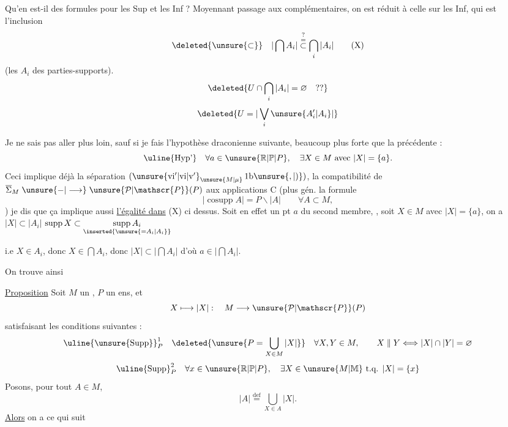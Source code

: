 
Qu'en est-il des formules pour les Sup et les Inf ? Moyennant passage aux complémentaires, on est réduit à celle sur les Inf, qui est l'inclusion
\[
\deleted{\unsure{\subset}}\quad |\bigcap A_i|\mathrel{\overset{\text{?}}{\overset{=}{\subset}}}\bigcap_i|A_i| \tag*{(X)}
\]
(les $A_i$ des parties-supports). 
\[
\deleted{U\cap\bigcap_i|A_i|=\varnothing\quad\text{??}}
\]
\[
\deleted{U=|\bigvee_i\unsure{A'_i|A_i}|}
\]

Je ne sais pas aller plus loin, sauf si je fais l'hypothèse draconienne suivante, beaucoup plus forte que la précédente :
\[
\text{\uline{Hyp'}}\quad \forall a\in\unsure{\mathbb{R}|\mathbb{P}|P},\quad\exists X\in M\text{ avec }|X|=\{a\}.
\]
Ceci implique déjà la séparation $(\unsure{\mathrm{vi}'|\mathrm{vi}|\mathrm{v}'}_{\unsure{M|\mu}}\,1\mathrm{b}\unsure{,|)})$, la compatibilité de $\overline{\Sigma}_M\mathrel{\unsure{-|\longrightarrow}}\unsure{\mathcal{P}|\mathscr{P}}(P)$ aux applications $\mathrm{C}$ (plus gén. la formule
\[
|\operatorname{cosupp}A|=P\smallsetminus|A|\qquad\forall A\subset M,
\]
) je dis que ça implique aussi \uline{l'égalité dans} (X) ci dessus. Soit en effet un pt $a$ du second membre, , soit $X\in M$  avec $|X|=\{a\}$, on a  $|X|\subset|A_i|$ \deleted{$\unsure{\Rightarrow}$} $\operatorname{supp}X\subset\underset{\inserted{\unsure{=A_i|A_i}}}{\operatorname{supp}A_i}$

i.e $X\in A_i$, donc $X\in\bigcap A_i$, donc $|X|\subset|\bigcap A_i|$ d'où $a\in|\bigcap A_i|$.

On trouve ainsi

\uline{Proposition} Soit $M$ un ,  $P$ un ens, et
\[
X\longmapsto|X|:\quad M\longrightarrow\unsure{\mathcal{P}|\mathscr{P}}(P)
\]
satisfaisant les conditions suivantes :
\[
\text{\uline{\unsure{Supp}}}_{P}^{1}\quad
\deleted{\unsure{P=\bigcup_{X\in M}|X|}}\quad
\forall X,Y\in M,\qquad X\mathrel{\Vert}Y\Longleftrightarrow|X|\cap|Y|=\varnothing
\]
\[
\text{\uline{Supp}}_{P}^{2}\quad
\forall x\in\unsure{\mathbb{R}|\mathbb{P}|P},\quad\exists X\in\unsure{M|\mathbb{M}}\text{ t.q. }|X|=\{x\}
\]
Posons, pour tout $A\in M$,
\[
|A|\overset{\text{def}}{=}\bigcup_{X\in A}|X|.
\]
\uline{Alors} on a ce qui suit

